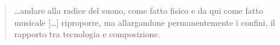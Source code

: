 \documentclass{gs-adonis}
\begin{document}

\begin{quote}
  …andare alla radice del suono, come fatto fisico e da qui come fatto musicale […] riproporre, ma allargandone permanentemente i confini, il rapporto tra tecnologia e composizione.
\end{quote}








\end{document}
